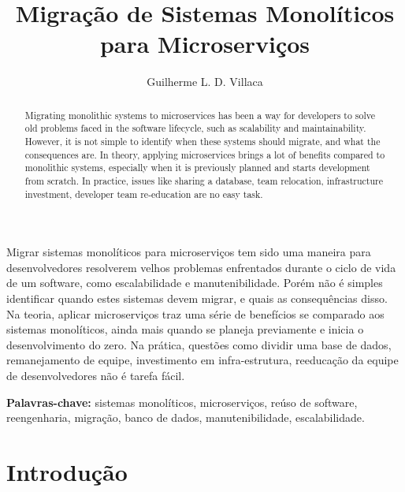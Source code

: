 \documentclass[12pt]{article}
\title{Migração de Sistemas Monolíticos para Microserviços}
\author{Guilherme L. D. Villaca\inst{1}}
\begin{document}
 

\maketitle

\begin{abstract}
Migrating monolithic systems to microservices has been a way for developers to solve old problems faced in the software lifecycle, such as scalability and maintainability. However, it is not simple to identify when these systems should migrate, and what the consequences are. In theory, applying microservices brings a lot of benefits compared to monolithic systems, especially when it is previously planned and starts development from scratch. In practice, issues like sharing a database, team relocation, infrastructure investment, developer team re-education are no easy task.
\end{abstract}
     
\begin{resumo} 
Migrar sistemas monolíticos para microserviços tem sido uma maneira para desenvolvedores resolverem velhos problemas enfrentados durante o ciclo de vida de um software, como escalabilidade e manutenibilidade. Porém não é simples identificar quando estes sistemas devem migrar, e quais as consequências disso. Na teoria, aplicar microserviços traz uma série de benefícios se comparado aos sistemas monolíticos, ainda mais quando se planeja previamente e inicia o desenvolvimento do zero. Na prática, questões como dividir uma base de dados, remanejamento de equipe, investimento em infra-estrutura, reeducação da equipe de desenvolvedores não é tarefa fácil.
\end{resumo}

{\bf Palavras-chave:} sistemas monolíticos, microserviços, reúso de software, reengenharia, migração, banco de dados, manutenibilidade, escalabilidade.


\section{Introdução}

\end{document}
